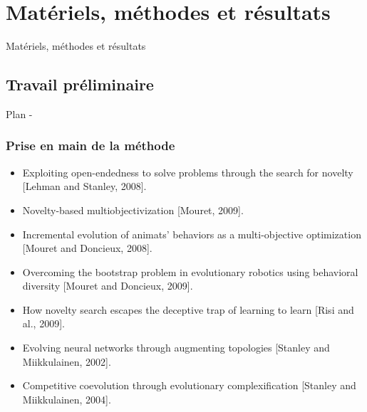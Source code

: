 \documentclass{beamer}
\begin{document}

\section{Matériels, méthodes et résultats}
\begin{frame}
\begin{center}
{\LARGE Matériels, méthodes et résultats}
\end{center}
\end{frame}

%
%

\subsection{Travail préliminaire}

\begin{frame}{Plan - \secname}
\tableofcontents[sectionstyle=hide/hide,subsectionstyle=show/shaded/hide ]
\end{frame}


\begin{frame}
\frametitle{Prise en main de la méthode}
\begin{itemize}
    \item Exploiting open-endedness to solve problems through the search for novelty [Lehman and Stanley, 2008].
    \item Novelty-based multiobjectivization [Mouret, 2009].
    \item Incremental evolution of animats' behaviors as a multi-objective optimization [Mouret and Doncieux, 2008].
    \item Overcoming the bootstrap problem in evolutionary robotics using behavioral diversity [Mouret and Doncieux, 2009].
    \item How novelty search escapes the deceptive trap of learning to learn [Risi and al., 2009].
    \item Evolving neural networks through augmenting topologies [Stanley and Miikkulainen, 2002].
    \item Competitive coevolution through evolutionary complexification [Stanley and Miikkulainen, 2004].
\end{itemize}
\end{frame}
\end{document}
